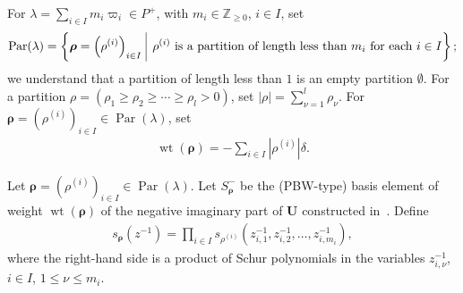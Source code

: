 \documentclass[ALCO,ThmDefs,Unicode,epreuves]{cedram}
\newcommand{\BZ}{\mathbb{Z}}
\newcommand\bmrho[1]{\boldsymbol{#1}}
\renewcommand{\U}{\mathbf{U}}
\DeclareMathOperator{\wt}{wt}
\DeclareMathOperator{\Par}{Par}
\begin{document}
For 
$\lambda = \sum_{i \in I} m_i \varpi_i \in P^+$, 
with 
$m_i \in \BZ_{\geq 0}$, $i \in I$, 
set 
\begin{align} \label{eq:Par}
\Par (\lambda) = \left\{ \bmrho{\rho} = \left( \rho^{(i)} \right)_{i \in I} \ \vline \ 
\rho^{(i)} \ \text{is a partition of length less than} \ m_i \ \text{for each} \ i \in I \right\} ;
\end{align}
we understand that a partition of length less than $1$ is an empty partition $\emptyset$. 
For a partition $\rho = (\rho_1 \geq \rho_2 \geq \cdots \geq \rho_l > 0)$, 
set 
$|\rho| = \sum_{\nu = 1}^l \rho_{\nu}$.
For 
$\bmrho{\rho} = \left( \rho^{(i)} \right)_{i \in I} \in \Par (\lambda)$, 
set 
\begin{align}
\wt (\bmrho{\rho}) = -\sum_{i \in I} \left| \rho^{(i)} \right| \delta .
\end{align}

Let $\bmrho{\rho} = \left( \rho^{(i)} \right)_{i \in I} \in \Par (\lambda)$. 
Let
$S_{\bmrho{\rho}}^-$
be the (PBW-type) basis element 
of weight $\wt (\bmrho{\rho})$ 
of the negative imaginary part of $\U$ 
constructed in~\cite[the element $S_{\mathbf{c}_0}^-$ in \S~3.1; see also Remark~4.1]{BN04}.
Define
\begin{align} \label{eq:Schur}
s_{\bmrho{\rho}}(z^{-1})
=
\prod_{i \in I} s_{\rho^{(i)}} ( z_{i,1}^{-1} , z_{i,2}^{-1} , \ldots , z_{i,m_i}^{-1} ),
\end{align}
where the right-hand side is a product of Schur polynomials in the variables 
$z_{i,\nu}^{-1}$, $i \in I$, $1 \leq \nu \leq m_i$.
\end{document}
